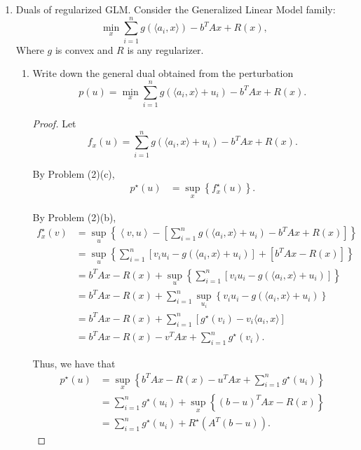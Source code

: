 \documentclass[11pt]{amsart}
\begin{document}
\begin{enumerate}
\item Duals of regularized GLM. Consider the Generalized Linear Model family: 
\[
\min_{x} \sum_{i=1}^n g(\langle a_i, x\rangle) - b^TAx + R(x),
\]
Where $g$ is convex and $R$ is any regularizer. 
\begin{enumerate}
\item Write down the general dual obtained from the perturbation 
\[
p(u) = \min_{x} \sum_{i=1}^n g(\langle a_i, x\rangle + u_i) - b^TAx + R(x).
\]

\begin{proof}
  Let
  \begin{equation*}    
    f_x\left(u\right) = \sum_{i=1}^n g(\langle a_i, x\rangle + u_i) - b^TAx + R(x).
  \end{equation*}

  By Problem (2)(c),
  \begin{align*}        
    p^\star\left(u\right)
    &= \sup_x\left\{f_x^\star\left(u\right)\right\}.
  \end{align*}

  By Problem (2)(b),
  \begin{align*}
    f_x^\star\left(v\right)
    &= \sup_u\left\{
      \left\langle v, u\right\rangle
      - \left[\sum_{i=1}^n g(\langle a_i, x\rangle + u_i) - b^TAx + R(x)\right]\right\} \\
    &= \sup_u\left\{
      \sum_{i=1}^n \left[v_iu_i - g(\langle a_i, x\rangle + u_i)\right] +
      \left[b^TAx - R(x)\right]
      \right\} \\
    &= b^TAx - R(x) + \sup_u\left\{
      \sum_{i=1}^n \left[v_iu_i - g(\langle a_i, x\rangle + u_i)\right]\right\} \\
    &= b^TAx - R(x) + 
      \sum_{i=1}^n \sup_{u_i}\left\{v_iu_i - g(\langle a_i, x\rangle + u_i)\right\} \\
    &=  b^TAx - R(x) + \sum_{i=1}^n\left[
      g^\star\left(v_i\right) -v_i\langle a_i, x\rangle \right] \\
    &=  b^TAx - R(x) - v^TAx
      + \sum_{i=1}^ng^\star\left(v_i\right).
  \end{align*}

  Thus, we have that
  \begin{align*}
    p^\star\left(u\right)
    &= \sup_x \left\{b^TAx - R(x) - u^TAx + \sum_{i=1}^ng^\star\left(u_i\right)\right\} \\
    &= \sum_{i=1}^ng^\star\left(u_i\right) + \sup_x \left\{\left(b - u\right)^TAx - R(x)\right\} \\
    &= \sum_{i=1}^ng^\star\left(u_i\right) + R^\star\left(A^T\left(b - u\right)\right).
  \end{align*}
\end{proof}


\end{enumerate}
\end{enumerate}
\end{document}
